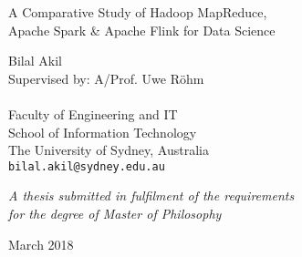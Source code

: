 \documentclass[11pt,a4paper,british]{report}
\begin{document}
\begin{titlepage}
  \centering

  {\LARGE
    A Comparative Study of Hadoop MapReduce,\\
    Apache Spark \& Apache Flink for Data Science
  \par}

  \vspace{2cm}

  {\large
    Bilal Akil\\
    Supervised by: A/Prof. Uwe R\"ohm\\
    ~\\
    Faculty of Engineering and IT\\
    School of Information Technology\\
    The University of Sydney, Australia\\
    {\tt bilal.akil@sydney.edu.au}
  \par}

  \vfill

  {\large\it
    A thesis submitted in fulfilment of the requirements\\
    for the degree of Master of Philosophy
  \par}

  \vspace{2cm}

  {\large March 2018 \par}
\end{titlepage}


\end{document}
